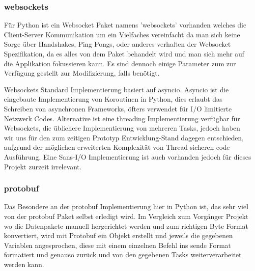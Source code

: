 \subsubsection{websockets}
Für Python ist ein Websocket Paket namens 'websockets' vorhanden welches die Client-Server Kommunikation
um ein Vielfaches vereinfacht da man sich keine Sorge über Handshakes, Ping Pongs, oder anderes verhalten
der Websocket Spezifikation, da es alles von dem Paket behandelt wird 
und man sich mehr auf die Applikation fokussieren kann. 
Es sind dennoch einige Parameter zum zur Verfügung gestellt zur Modifizierung, falls benötigt.

Websockets Standard Implementierung basiert auf asyncio.
%  
Asyncio ist die eingebaute Implementierung von Koroutinen in Python,
dies erlaubt das Schreiben von asynchronen Frameworks, 
öfters verwendet für I/O limitierte Netzwerk Codes.
Alternative ist eine threading Implementierung verfügbar für Websockets, 
die üblichere Implementierung von mehreren Tasks, 
jedoch haben wir uns für den zum zeitigen Prototyp Entwicklung-Stand dagegen entschieden,
aufgrund der möglichen erweiterten Komplexität von Thread sicheren code Ausführung.
Eine Sans-I/O Implementierung ist auch vorhanden jedoch für dieses Projekt zurzeit irrelevant.

\subsubsection{protobuf}
Das Besondere an der protobuf Implementierung hier in Python ist,
das sehr viel von der protobuf Paket selbst erledigt wird.
Im Vergleich zum Vorgänger Projekt wo die Datenpakete manuell hergerichtet werden
und zum richtigen Byte Format konvertiert, wird mit Protobuf ein Objekt erstellt 
und jeweils die gegebenen Variablen angesprochen, 
diese mit einem einzelnen Befehl ins sende Format formatiert und genauso zurück
und von den gegebenen Tasks weiterverarbeitet werden kann.


